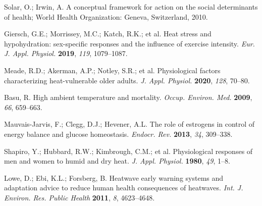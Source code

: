 \documentclass[journal,article,submit,pdftex,moreauthors]{Definitions/mdpi}
\begin{document}
\begin{thebibliography}{999}
Solar, O.; Irwin, A. A conceptual framework for action on the social determinants of health; World Health Organization: Geneva, Switzerland, 2010.

Giersch, G.E.; Morrissey, M.C.; Katch, R.K.; et al. Heat stress and hypohydration: sex-specific responses and the influence of exercise intensity. \emph{Eur. J. Appl. Physiol.} \textbf{2019}, \emph{119}, 1079--1087.

Meade, R.D.; Akerman, A.P.; Notley, S.R.; et al. Physiological factors characterizing heat-vulnerable older adults. \emph{J. Appl. Physiol.} \textbf{2020}, \emph{128}, 70--80.

Basu, R. High ambient temperature and mortality. \emph{Occup. Environ. Med.} \textbf{2009}, \emph{66}, 659--663.

Mauvais-Jarvis, F.; Clegg, D.J.; Hevener, A.L. The role of estrogens in control of energy balance and glucose homeostasis. \emph{Endocr. Rev.} \textbf{2013}, \emph{34}, 309--338.

Shapiro, Y.; Hubbard, R.W.; Kimbrough, C.M.; et al. Physiological responses of men and women to humid and dry heat. \emph{J. Appl. Physiol.} \textbf{1980}, \emph{49}, 1--8.

Lowe, D.; Ebi, K.L.; Forsberg, B. Heatwave early warning systems and adaptation advice to reduce human health consequences of heatwaves. \emph{Int. J. Environ. Res. Public Health} \textbf{2011}, \emph{8}, 4623--4648.

\end{thebibliography}

\end{document}
